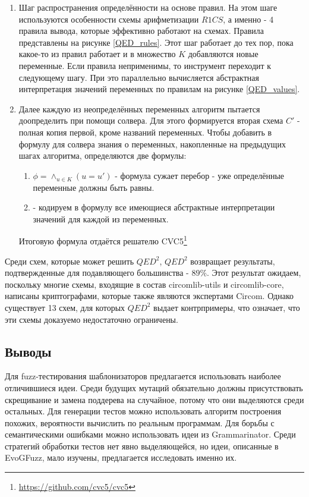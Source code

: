 \documentclass[a4paper]{article}
\begin{document}
\begin{enumerate}
    \item Шаг распространения определённости на основе правил. На этом шаге используются особенности схемы арифметизации $R1CS$, а именно - 4 правила вывода, которые эффективно работают на схемах. Правила представлены на рисунке \ref{QED_rules}. Этот шаг работает до тех пор, пока какое-то из правил работает и в множество $K$ добавляются новые переменные. Если правила неприменимы, то инструмент переходит к следующему шагу. При это параллельно вычисляется абстрактная интерпретация значений переменных по правилам на рисунке \ref{QED_values}.
    \item Далее каждую из неопределённых переменных алгоритм пытается доопределить при помощи солвера. Для этого формируется вторая схема $C'$ - полная копия первой, кроме названий переменных. Чтобы добавить в формулу для солвера знания о переменных, накопленные на предыдущих шагах алгоритма, определяются две формулы:
    \begin{enumerate}
        \item $\phi = \land_{u \in K} (u = u')$ - формула сужает перебор - уже определённые переменные должны быть равны.
        \item - кодируем в формулу все имеющиеся абстрактные интерпретации значений для каждой из переменных.
    \end{enumerate}
    Итоговую формула отдаётся решателю CVC5\footnote[1]{\href{https://github.com/cvc5/cvc5}{https://github.com/cvc5/cvc5}}
\end{enumerate}


Среди схем, которые может решить $QED^2$, $QED^2$ возвращает результаты, подтвержденные для подавляющего большинства - $89\%$.
Этот результат ожидаем, поскольку многие схемы, входящие в состав circomlib-utils и circomlib-core, написаны криптографами, которые также являются экспертами Circom. Однако существует 13 схем, для
которых $QED^2$ выдает контрпримеры, что означает, что эти схемы доказуемо недостаточно ограничены.

\subsection{Выводы}
\indent

Для fuzz-тестирования шаблонизаторов предлагается использовать наиболее отличившиеся идеи. Среди будущих мутаций обязательно должны присутствовать скрещивание и замена поддерева на случайное, потому что они выделяются среди остальных. Для генерации тестов можно использовать алгоритм построения похожих, вероятности вычислить по реальным программам. Для борьбы с семантическими ошибками можно использовать идеи из Grammarinator. Среди стратегий обработки тестов нет явно выделяющейся, но идеи, описанные в EvoGFuzz, мало изучены, предлагается исследовать именно их.
\end{document}
